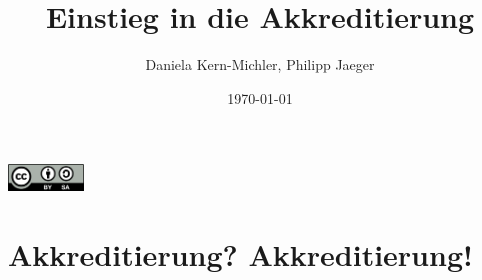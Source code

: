 \documentclass{beamer}
\title{Einstieg in die Akkreditierung}
\author{Daniela Kern-Michler, Philipp Jaeger}
\date{\today}
\begin{document}
\begin{frame}
\maketitle
\vfill
\hspace*{.8\linewidth}\includegraphics[width=2cm]{CC-BY-SA.png}
\end{frame}


\begin{frame}
\tableofcontents
\end{frame}

\section{Akkreditierung? Akkreditierung!}
\end{document}
